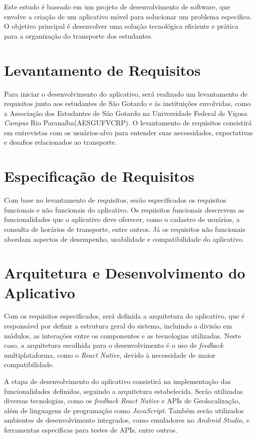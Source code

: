 \documentclass[
    12pt,                   %
    openright,              %
    oneside,                %
    a4paper,                %
    sumario=tradicional,    %
    english,                %
    brazil,                 %
    ]{abntex2}
\begin{document}
Este estudo é baseado em um projeto de desenvolvimento de software, que envolve a criação de um aplicativo móvel para solucionar um problema específico. O objetivo principal é desenvolver uma solução tecnológica eficiente e prática para a organização do transporte dos estudantes.

\section{Levantamento de Requisitos}

Para iniciar o desenvolvimento do aplicativo, será realizado um levantamento de requisitos junto aos estudantes de São Gotardo e às instituições envolvidas, como a Associação dos Estudantes de São Gotardo na Universidade
Federal de Viçosa \textit{Campus} Rio Paranaíba(AESGUFVCRP). O levantamento de requisitos consistirá em entrevistas com os usuários-alvo para entender suas necessidades, expectativas e desafios relacionados ao transporte.

\section{Especificação de Requisitos}

Com base no levantamento de requisitos, serão especificados os requisitos funcionais e não funcionais do aplicativo. Os requisitos funcionais descrevem as funcionalidades que o aplicativo deve oferecer, como o cadastro de usuários, a consulta de horários de transporte, entre outros. Já os requisitos não funcionais abordam aspectos de desempenho, usabilidade e compatibilidade do aplicativo.

\section{Arquitetura e Desenvolvimento do Aplicativo}
\label{sec:arquitetura-desenvolvimento-aplicativo}

Com os requisitos especificados, será definida a arquitetura do aplicativo, que é responsável por definir a estrutura geral do sistema, incluindo a divisão em módulos, as interações entre os componentes e as tecnologias utilizadas. Neste caso, a arquitetura escolhida para o desenvolvimento é o uso de \textit{feedback} multiplataforma, como o \textit{React Native}, devido à necessidade de maior compatibilidade.

A etapa de desenvolvimento do aplicativo consistirá na implementação das funcionalidades definidas, seguindo a arquitetura estabelecida. Serão utilizadas diversas tecnologias, como os \textit{feedback} \textit{React Native} e APIs de Geolocalização, além de linguagens de programação como \textit{JavaScript}. Também serão utilizados ambientes de desenvolvimento integrados, como emuladores no \textit{Android Studio}, e ferramentas específicas para testes de APIs, entre outros.
\end{document}
